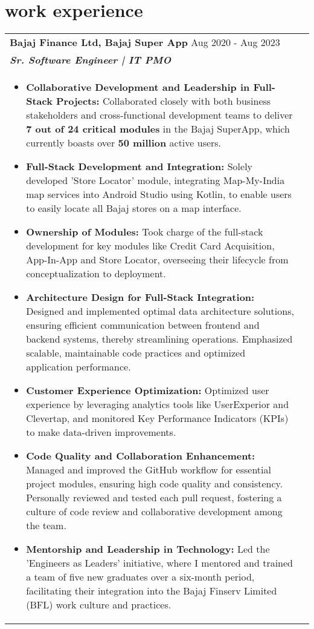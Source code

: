 \documentclass[a4paper,8pt]{article}
\begin{document}
\section{work experience}
\begin{tabularx}{\linewidth}{ @{}l r@{} }
\textbf{{Bajaj Finance Ltd, Bajaj Super App}} \hfill \color[HTML]{371e77} Aug 2020 - Aug 2023 \\[4pt]
\color[HTML]{371e77}\textbf{\textit{Sr. Software Engineer | IT PMO}} \color[HTML]{4B28A4} \\[5pt]
\begin{minipage}[t]{\linewidth}
    \begin{itemize}[nosep,after=\strut, leftmargin=2em, itemsep=2pt]
        \item \textbf{Collaborative Development and Leadership in Full-Stack Projects:} Collaborated closely with both business stakeholders and cross-functional development teams to deliver \textbf{7 out of 24 critical modules} in the Bajaj SuperApp, which currently boasts over \textbf{50 million} active users.
        \item \textbf{Full-Stack Development and Integration:} Solely developed 'Store Locator' module, integrating Map-My-India map services into Android Studio using Kotlin, to enable users to easily locate all Bajaj stores on a map interface.
        \item \textbf{Ownership of Modules:} Took charge of the full-stack development for key modules like Credit Card Acquisition, App-In-App and Store Locator, overseeing their lifecycle from conceptualization to deployment.
        \item \textbf{Architecture Design for Full-Stack Integration:} Designed and implemented optimal data architecture solutions, ensuring efficient communication between frontend and backend systems, thereby streamlining operations. Emphasized scalable, maintainable code practices and optimized application performance.
        \item \textbf{Customer Experience Optimization:}  Optimized user experience by leveraging analytics tools like UserExperior and Clevertap, and monitored Key Performance Indicators (KPIs) to make data-driven improvements.
        \item \textbf{Code Quality and Collaboration Enhancement:} Managed and improved the GitHub workflow for essential project modules, ensuring high code quality and consistency. Personally reviewed and tested each pull request, fostering a culture of code review and collaborative development among the team.
        \item \textbf{Mentorship and Leadership in Technology:} Led the 'Engineers as Leaders' initiative, where I mentored and trained a team of five new graduates over a six-month period, facilitating their integration into the Bajaj Finserv Limited (BFL) work culture and practices.
    \end{itemize}
\end{minipage}
\end{tabularx}
\end{document}
